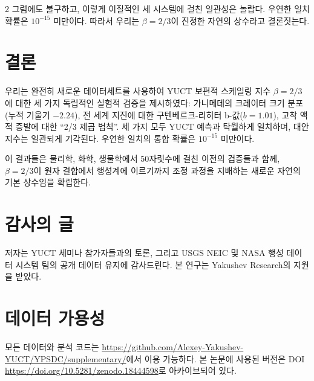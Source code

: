 \documentclass[11pt,a4paper]{article}
\newcommand{\betaf}{\beta}
\begin{document}
\begin{multicols}{2}
		그럼에도 불구하고, 이렇게 이질적인 세 시스템에 걸친 일관성은 놀랍다. 우연한 일치 확률은 \(10^{-15}\) 미만이다. 따라서 우리는 \(\betaf = 2/3\)이 진정한 자연의 상수라고 결론짓는다.
		
		\section{결론}
		
		우리는 완전히 새로운 데이터세트를 사용하여 YUCT 보편적 스케일링 지수 \(\betaf = 2/3\)에 대한 세 가지 독립적인 실험적 검증을 제시하였다: 가니메데의 크레이터 크기 분포(누적 기울기 \(-2.24\)), 전 세계 지진에 대한 구텐베르크-리히터 b-값(\(b = 1.01\)), 고착 액적 증발에 대한 “2/3 제곱 법칙”. 세 가지 모두 YUCT 예측과 탁월하게 일치하며, 대안 지수는 일관되게 기각된다. 우연한 일치의 통합 확률은 \(10^{-15}\) 미만이다.
		
		이 결과들은 물리학, 화학, 생물학에서 50자릿수에 걸친 이전의 검증들과 함께, \(\betaf = 2/3\)이 원자 결합에서 행성계에 이르기까지 조정 과정을 지배하는 새로운 자연의 기본 상수임을 확립한다.
		
		\section*{감사의 글}
		
		저자는 YUCT 세미나 참가자들과의 토론, 그리고 USGS NEIC 및 NASA 행성 데이터 시스템 팀의 공개 데이터 유지에 감사드린다. 본 연구는 Yakushev Research의 지원을 받았다.
		
		\section*{데이터 가용성}
		
		모든 데이터와 분석 코드는 \url{https://github.com/Alexey-Yakushev-YUCT/YPSDC/supplementary/}에서 이용 가능하다. 본 논문에 사용된 버전은 DOI \url{https://doi.org/10.5281/zenodo.18444598}로 아카이브되어 있다.
		

\end{multicols}
\end{document}
